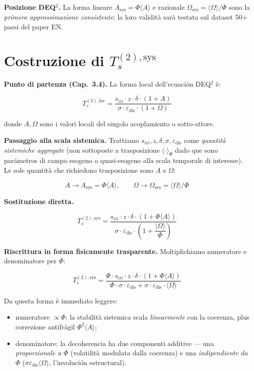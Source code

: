 \Proved{} \textbf{Posizione DEQ$^2$. } La forma lineare
\(A_{\text{sys}} = \Phi\langle A\rangle\) e razionale
\(\Omega_{\text{sys}} = \langle\Omega\rangle/\Phi\) sono la \emph{primero
approssimazione consistente}; la loro validità sarà testata sul dataset
50+ paesi del paper EN.



\section{\texorpdfstring{Costruzione di
\(T_s^{(2),\text{sys}}\)}{Costruzione di T\_s\^{}\{(2),\textbackslash text\{sys\}\}}}\label{costruzione-di-t_s2textsys}

\Proved{} \textbf{Punto di partenza (Cap.~3.4).} La forma local
dell'ecuación DEQ$^2$ è:

\[
T_s^{(2),\text{loc}} = \frac{s_{iii} \cdot z \cdot \delta \cdot (1+A)}{\sigma \cdot \varepsilon_{\text{dis}} \cdot (1+\Omega)}
\]

donde \(A, \Omega\) sono i valori locali del singolo acoplamiento o
sotto-attore.

\Hypoth{} \textbf{Passaggio alla scala sistemica.} Trattiamo
\(s_{iii}, z, \delta, \sigma, \varepsilon_{\text{dis}}\) come
\emph{quantità sistemiche aggregate} (non sottoposte a trasposizione
\(\langle \cdot \rangle_\Phi\) dado que sono parámetros di campo esogeno o
quasi-esogeno alla scala temporale di interesse). Le sole quantità che
richiedono trasposizione sono \(A\) e \(\Omega\):

\[
A \to A_{\text{sys}} = \Phi \langle A\rangle, \qquad \Omega \to \Omega_{\text{sys}} = \langle\Omega\rangle/\Phi
\]

\Proved{} \textbf{Sostituzione diretta.}

\[
\boxed{T_s^{(2),\text{sys}} = \frac{s_{iii} \cdot z \cdot \delta \cdot (1 + \Phi \langle A\rangle)}{\sigma \cdot \varepsilon_{\text{dis}} \cdot \left(1 + \dfrac{\langle\Omega\rangle}{\Phi}\right)}}
\]

\Proved{} \textbf{Riscrittura in forma fisicamente trasparente.}
Moltiplichiamo numeratore e denominatore per \(\Phi\):

\[
T_s^{(2),\text{sys}} = \frac{\Phi \cdot s_{iii} \cdot z \cdot \delta \cdot (1 + \Phi \langle A\rangle)}{\Phi \cdot \sigma \cdot \varepsilon_{\text{dis}} + \sigma \cdot \varepsilon_{\text{dis}} \cdot \langle\Omega\rangle}
\]

Da questa forma è immediato leggere:

\begin{itemize}
\tightlist
\item
  numeratore \(\propto \Phi\): la stabilità sistemica scala
  \emph{linearmente} con la coerenza, plus correzione antifrágil
  \(\Phi^2 \langle A\rangle\);
\item
  denominatore: la decoherencia ha due componenti additive --- una
  \emph{proporzionale a \(\Phi\)} (volatilità modulata dalla coerenza) e
  una \emph{indipendiente da \(\Phi\)}
  (\(\sigma \varepsilon_{\text{dis}} \langle\Omega\rangle\),
  l'involución estructural).
\end{itemize}



